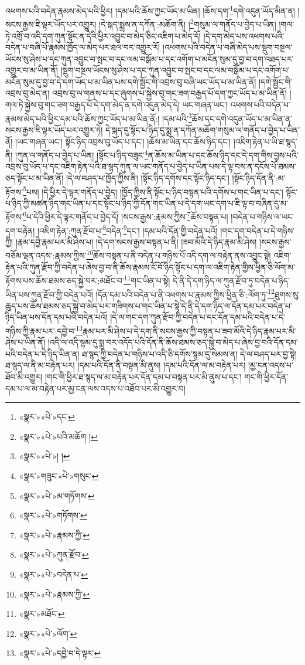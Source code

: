 འཕགས་པའི་བདེན་རྣམས་མེད་པའི་ཕྱིར། །དམ་པའི་ཆོས་ཀྱང་ཡོད་མ་ཡིན། །ཆོས་དག་\footnote{«སྣར་»«པེ་»དང་}དགེ་འདུན་ཡོད་མིན་ན། །སངས་རྒྱས་ཇི་ལྟར་ཡོད་པར་འགྱུར། །དེ་སྐད་སྨྲས་ན་དཀོན་:མཆོག་ནི། །\footnote{«སྣར་»«པེ་»པའི་མཆོག །}གསུམ་ལ་གནོད་པ་བྱེད་པ་ཡིན། །གལ་ཏེ་འགྲོ་བ་འདི་དག་ཀུན་སྟོང་ན་དེའི་ཕྱིར་འབྱུང་བ་མེད་ཅིང་འཇིག་པ་མེད་དོ། །དེ་དག་མེད་པས་འཕགས་པའི་བདེན་པ་བཞི་པོ་རྣམས་ཁྱོད་ལ་མེད་པར་ཐལ་བར་འགྱུར་རོ། །འཕགས་པའི་བདེན་པ་བཞི་མེད་པས་སྡུག་བསྔལ་ཡོངས་སུ་ཤེས་པ་དང་ཀུན་འབྱུང་བ་སྤང་བ་དང་ལམ་བསྒོམ་པ་དང་འགོག་པ་མངོན་སུམ་དུ་བྱ་བ་དག་འཐད་པར་འགྱུར་བ་མ་ཡིན་ནོ། །སྡུག་བསྔལ་ཡོངས་སུ་ཤེས་པ་དང་ཀུན་འབྱུང་བ་སྤང་བ་དང་ལམ་བསྒོམ་པ་དང་འགོག་པ་མངོན་སུམ་དུ་བྱ་བ་དེ་དག་ཡོད་པ་མ་ཡིན་པས་དགེ་སྦྱོང་གི་འབྲས་བུ་བཞི་ཡང་ཡོད་པ་མ་ཡིན་ནོ། །དགེ་སྦྱོང་གི་འབྲས་བུ་མེད་ན། འབྲས་བུ་ལ་གནས་པ་དང་ཞུགས་པ་སྐྱེས་བུ་གང་ཟག་བརྒྱད་པོ་དག་ཀྱང་ཡོད་པ་མ་ཡིན་ནོ། །གལ་ཏེ་སྐྱེས་བུ་གང་ཟག་བརྒྱད་པོ་དེ་དག་མེད་ན་དགེ་འདུན་མེད་དེ། ཡང་གཞན་ཡང་། འཕགས་པའི་བདེན་པ་རྣམས་མེད་པའི་ཕྱིར་དམ་པའི་ཆོས་ཀྱང་ཡོད་པ་མ་ཡིན་ནོ:། །དམ་པའི་\footnote{«སྣར་»«པེ་»། །}ཆོས་དང་དགེ་འདུན་ཡོད་པ་མ་ཡིན་ན་སངས་རྒྱས་ཇི་ལྟར་ཡོད་པར་འགྱུར་ཏེ། དེ་སྐད་དུ་སྟོང་པ་ཉིད་དུ་སྨྲ་ན་དཀོན་མཆོག་གསུམ་ལ་གནོད་པ་བྱེད་པ་ཡིན་ནོ། །ཡང་གཞན་ཡང་། སྟོང་ཉིད་འབྲས་བུ་ཡོད་པ་དང་། །ཆོས་མ་ཡིན་དང་ཆོས་ཉིད་དང་། །འཇིག་རྟེན་པ་ཡི་ཐ་སྙད་ནི། །ཀུན་ལ་གནོད་པ་བྱེད་པ་ཡིན། །སྟོང་པ་ཉིད་བཟུང་\footnote{«སྣར་»གཟུང་«པེ་»གསུང་}ན་ཆོས་མ་ཡིན་པ་དང་ཆོས་ཉིད་དང་དེ་དག་གིས་བྱས་པའི་འབྲས་བུ་ཡོད་པ་དང་འཇིག་རྟེན་པའི་ཐ་སྙད་ཀུན་ལ་ཡང་གནོད་པ་བྱེད་པ་ཡིན་པས་དེ་ལྟ་བས་ན་དངོས་པོ་ཐམས་ཅད་སྟོང་པ་མ་ཡིན་ནོ། །དེ་ལ་བཤད་པ་ཁྱོད་ཀྱིས་ནི། །སྟོང་ཉིད་དགོས་དང་སྟོང་ཉིད་དང་། །སྟོང་ཉིད་དོན་ནི་:མ་རྟོགས་\footnote{«སྣར་»«པེ་»མ་གཏོགས་}པས། །དེ་ཕྱིར་དེ་ལྟར་གནོད་པ་བྱེད། །ཁྱོད་ཀྱིས་ནི་སྟོང་པ་ཉིད་བསྟན་པའི་དགོས་པ་གང་ཡིན་པ་དང་། སྟོང་པ་ཉིད་ཀྱི་མཚན་ཉིད་གང་ཡིན་པ་དང་སྟོང་པ་ཉིད་ཀྱི་དོན་གང་ཡིན་པ་དེ་དག་ཡང་དག་པ་ཇི་ལྟ་བ་བཞིན་དུ་མ་རྟོགས་\footnote{«སྣར་»«པེ་»གཏོགས་}པ་དེའི་ཕྱིར་དེ་ལྟར་གནོད་པ་བྱེད་དོ། །སངས་རྒྱས་:རྣམས་ཀྱིས་\footnote{«སྣར་»«པེ་»རྣམས་ཀྱི་}ཆོས་བསྟན་པ། །བདེན་པ་གཉིས་ལ་ཡང་དག་བརྟེན། །འཇིག་རྟེན་:ཀུན་རྫོབ་པ་\footnote{«སྣར་»«པེ་»ཀུན་རྫོབ་}བདེན་\footnote{«སྣར་»«པེ་»བདེན་པ་}དང་། །དམ་པའི་དོན་གྱི་བདེན་པའོ། །གང་དག་བདེན་པ་དེ་གཉིས་ཀྱི། །རྣམ་དབྱེ་རྣམ་པར་མི་ཤེས་པ། །དེ་དག་སངས་རྒྱས་བསྟན་པ་ནི། །ཟབ་མོའི་དེ་ཉིད་རྣམ་མི་ཤེས། །སངས་རྒྱས་བཅོམ་ལྡན་འདས་:རྣམས་ཀྱིས་\footnote{«སྣར་»«པེ་»རྣམས་ཀྱི་}ཆོས་བསྟན་པ་ནི་བདེན་པ་གཉིས་པོ་འདི་དག་ལ་བརྟེན་ནས་འབྱུང་སྟེ། འཇིག་རྟེན་པའི་ཀུན་རྫོབ་ཀྱི་བདེན་པ་ཞེས་བྱ་བ་ནི་ཆོས་རྣམས་ངོ་བོ་ཉིད་སྟོང་པ་དག་ལ་འཇིག་རྟེན་གྱིས་ཕྱིན་ཅི་ལོག་མ་རྟོགས་པས་ཆོས་ཐམས་ཅད་སྐྱེ་བར་:མཐོང་བ་\footnote{«སྣར་»མཐོང་}གང་ཡིན་པ་སྟེ། དེ་ནི་དེ་དག་ཉིད་ལ་ཀུན་རྫོབ་ཏུ་བདེན་པ་ཉིད་ཡིན་པས་ཀུན་རྫོབ་ཀྱི་བདེན་པའོ། །དོན་དམ་པའི་བདེན་པ་ནི་འཕགས་པ་རྣམས་ཀྱིས་ཕྱིན་ཅི་:ལོག་ཏུ་\footnote{«སྣར་»«པེ་»ལོག་}ཐུགས་སུ་ཆུད་པས་ཆོས་ཐམས་ཅད་སྐྱེ་བ་མེད་པར་གཟིགས་པ་གང་ཡིན་པ་སྟེ་དེ་ནི་དེ་དག་ཉིད་ལ་དོན་དམ་པར་བདེན་པ་ཉིད་ཡིན་པས་དོན་དམ་པའི་བདེན་པའོ། །དེ་ལ་གང་དག་ཀུན་རྫོབ་ཀྱི་བདེན་པ་དང་དོན་དམ་པའི་བདེན་པ་དེ་གཉིས་ཀྱི་རྣམ་པར་:དབྱེ་བ་\footnote{«སྣར་»«པེ་»དབྱེ་བ་དེ་ལྟར་}རྣམ་པར་མི་ཤེས་པ་དེ་དག་ནི་སངས་རྒྱས་ཀྱི་བསྟན་པ་ཟབ་མོའི་དེ་ཉིད་རྣམ་པར་མི་ཤེས་པ་ཡིན་ནོ། །འདི་ལ་འདི་སྙམ་དུ་སྨྲ་བར་འདོད་པའི་དོན་ནི་ཆོས་ཐམས་ཅད་སྐྱེ་བ་མེད་པ་ཞེས་བྱ་བའི་དོན་དམ་པའི་བདེན་པ་དེ་ཉིད་ཡིན་ན། ཐ་སྙད་ཀྱི་བདེན་པ་གཉིས་པ་འདི་ཅི་དགོས་སྙམ་དུ་སེམས་ན། དེ་ལ་བཤད་པར་བྱ་སྟེ། ཐ་སྙད་ལ་ནི་མ་བརྟེན་པར། །དམ་པའི་དོན་ནི་བསྟན་མི་ནུས། །དམ་པའི་དོན་ལ་མ་བརྟེན་པར། །མྱ་ངན་འདས་པ་ཐོབ་མི་འགྱུར། །གང་གི་ཕྱིར་ཐ་སྙད་ལ་མ་བརྟེན་པར་དོན་དམ་པ་བསྟན་པར་མི་ནུས་པ་དང་། གང་གི་ཕྱིར་དོན་དམ་པ་ལ་མ་བརྟེན་པར་མྱ་ངན་ལས་འདས་པ་འཐོབ་པར་མི་འགྱུར་བ། 